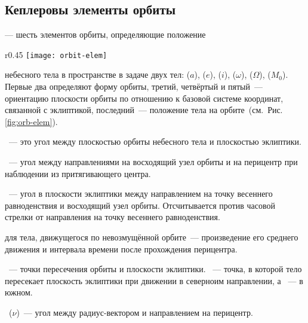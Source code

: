 \subsection{Кеплеровы элементы орбиты}

 --- шесть элементов орбиты, определяющие положение
\begin{wrapfigure}[14]{r}{0.45\tw}
	\centering
	\vspace{-1pc}
	\texttt{[image: orbit-elem]}
	\label{fig:orb-elem}
\end{wrapfigure}
небесного тела в пространстве в задаче двух тел:  ($a$),  ($e$),  ($i$),  ($\omega$),  ($\Omega$),  ($M_0$). Первые два определяют форму орбиты, третий, четвёртый и пятый~--- ориентацию плоскости орбиты по отношению к базовой системе координат, связанной с эклиптикой, последний~--- положение тела на орбите~(см.~Рис.\,\ref{fig:orb-elem}).

~--- это угол между плоскостью орбиты небесного тела и плоскостью эклиптики.

~--- угол между направлениями на восходящий узел орбиты и на перицентр при наблюдении из притягивающего центра.

~--- угол в плоскости эклиптики между направлением на точку весеннего равноденствия и восходящий узел орбиты. Отсчитывается против часовой стрелки от направления на точку весеннего равноденствия.

 для тела, движущегося по невозмущённой орбите~--- произведение его среднего движения и интервала времени после прохождения перицентра.

~--- точки пересечения орбиты и плоскости эклиптики. ~--- точка, в которой тело пересекает плоскость эклиптики при движении в северноим направлении, а ~--- в южном.

~($\nu$)~--- угол между радиус-вектором и направлением на перицентр.